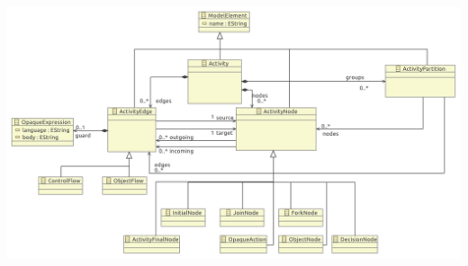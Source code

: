 \documentclass[a4paper,10pt]{article}
\begin{document}
\vspace{1em}
\includegraphics[width=\textwidth]{4/original_minimal_metamodel_4}
\end{document}
